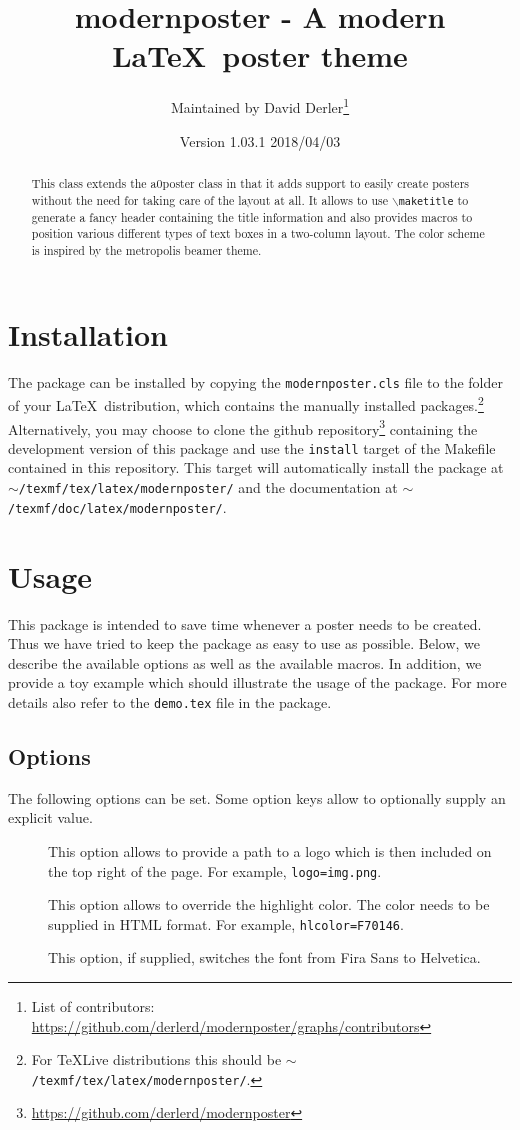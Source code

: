 \documentclass{article}
\title{modernposter - A modern \LaTeX~poster theme}
\author{Maintained by David Derler\thanks{List of contributors: \url{https://github.com/derlerd/modernposter/graphs/contributors}}}
\date{Version 1.03.1 2018/04/03}
\begin{document}
  \maketitle

  \begin{abstract}
\noindent This class extends the a0poster class in that it adds support to easily create posters without the need for taking care of the layout at all. It allows to use {\tt $\backslash$maketitle} to generate a fancy header containing the title information and also provides macros to position various different types of text boxes in a two-column layout. The color scheme  is inspired by the metropolis beamer theme.
  \end{abstract}
  \section{Installation}
  The package can be installed by copying the {\tt modernposter.cls} file to the folder of your \LaTeX~distribution, which contains the manually installed packages.\footnote{For TeXLive distributions this should be {\tt $\sim$/texmf/tex/latex/modernposter/}.} Alternatively, you may choose to clone the github repository\footnote{\url{https://github.com/derlerd/modernposter}} containing the development version of this package and use the {\tt install} target of the Makefile contained in this repository. This target will automatically install the package at {\tt $\sim$/texmf/tex/latex/modern\-poster/} and the documentation at {\tt $\sim$/texmf/doc/latex/modernposter/}.
  \section{Usage}
  This package is intended to save time whenever a poster needs to be created. Thus we have tried to keep the package as easy to use as possible. Below, we describe the available options as well as the available macros. In addition, we provide a toy example which should illustrate the usage of the package. For more details also refer to the {\tt demo.tex} file in the package.
  \subsection{Options}
  The following options can be set. Some option keys allow to optionally supply an explicit value.  
  \begin{description}
  	\item[] This option allows to provide a path to a logo which is then included on the top right of the page. For example, {\tt logo=img.png}.
  	\item[] This option allows to override the highlight color. The color needs to be supplied in HTML format. For example, {\tt hlcolor=F70146}. 
    \item[] This option, if supplied, switches the font from Fira Sans to Helvetica.
  \end{description}
\end{document}
